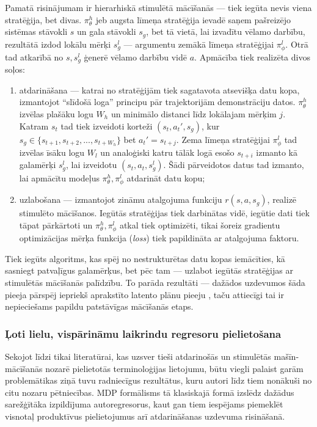 \documentclass[12pt, a4paper]{article}
\numberwithin{equation}{section} %
\begin{document}
Pamatā risinājumam ir hierarhiskā stimulētā mācīšanās --- tiek iegūta nevis viena stratēģija, bet divas. $\pi_{\theta}^h$ jeb augsta līmeņa stratēģija ievadē saņem pašreizējo sistēmas stāvokli $s$ un gala stāvokli $s_g$, bet tā vietā, lai izvadītu vēlamo darbību, rezultātā izdod lokālu mērķi $s_g^l$ --- argumentu zemākā līmeņa stratēģijai $\pi_{\phi}^l$. Otrā tad atkarībā no $s,s_g^l$ ģenerē vēlamo darbību vidē $a$. Apmācība tiek realizēta divos soļos:

\begin{enumerate}
    \item atdarināšana --- katrai no stratēģijām tiek sagatavota atsevišķa datu kopa, izmantojot ``slīdošā loga'' principu pār trajektorijām demonstrāciju datos. $\pi_{\theta}^h$ izvēlas plašāku logu $W_h$ un minimālo distanci līdz lokālajam mērķim $j$. Katram $s_t $ tad tiek izveidoti korteži $(s_t, a_t', s_g)$, kur $s_g \in \lbrace s_{t+1}, s_{t+2}, ..., s_{t+W_h} \rbrace$ bet $a_t' = s_{t+j}$. Zema līmeņa stratēģijai $\pi_{\phi}^l$ tad izvēlas īsāku logu $W_l$ un analoģiski katru tālāk logā esošo $s_{t+i}$ izmanto kā galamērķi $s_g^l$, lai izveidotu $(s_t, a_t, s_g^l)$. Šādi pārveidotos datus tad izmanto, lai apmācītu modeļus $\pi_{\theta}^h, \pi_{\phi}^l$ atdarināt datu kopu;
    \item uzlabošana --- izmantojot zināmu atalgojuma funkciju $r(s,a,s_g)$, realizē stimulēto mācīšanos. Iegūtās stratēģijas tiek darbinātas vidē, iegūtie dati tiek tāpat pārkārtoti un $\pi_{\theta}^h, \pi_{\phi}^l$ atkal tiek optimizēti, tikai šoreiz gradientu optimizācijas mērķa funkcija (\textit{loss}) tiek papildināta ar atalgojuma faktoru.
\end{enumerate}

Tiek iegūts algoritms, kas spēj no nestrukturētas datu kopas iemācīties, kā sasniegt patvaļīgus galamērķus, bet pēc tam --- uzlabot iegūtās stratēģijas ar stimulētās mācīšanās palīdzību. To parāda rezultāti --- dažādos uzdevumos šāda pieeja pārspēj iepriekš aprakstīto latento plānu pieeju \cite{lynch2020learning}, taču attiecīgi tai ir nepieciešams papildu patstāvīgas mācīšanās etaps.

\subsubsection{Ļoti lielu, vispārināmu laikrindu regresoru pielietošana}

Sekojot līdzi tikai literatūrai, kas uzsver tieši atdarinošās un stimulētās mašīn-mācīšanās nozarē pielietotās terminoloģijas lietojumu, būtu viegli palaist garām problemātikas ziņā tuvu radniecīgus rezultātus, kuru autori līdz tiem nonākuši no citu nozaru pētniecības. MDP formālisms tā klasiskajā formā izslēdz dažādus sarežģītāka izpildījuma autoregresorus, kaut gan tiem iespējams piemeklēt visnotaļ produktīvus pielietojumus arī atdarināšanas uzdevuma risināšanā.
\end{document}
